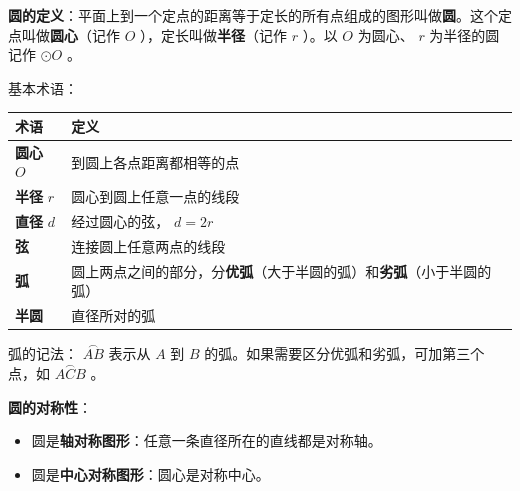 \begin{understand}


\textbf{圆的定义}：平面上到一个定点的距离等于定长的所有点组成的图形叫做\textbf{圆}。这个定点叫做\textbf{圆心}（记作 $O$ ），定长叫做\textbf{半径}（记作 $r$ ）。以 $O$ 为圆心、 $r$ 为半径的圆记作 $\odot O$ 。

\begin{center}
\label{fig:circle-elements}
\end{center}


基本术语：
\begin{center}
\begin{tabular}{ll}
\toprule
术语 & 定义 \\
\midrule
\textbf{圆心} $O$ & 到圆上各点距离都相等的点 \\
\textbf{半径} $r$ & 圆心到圆上任意一点的线段 \\
\textbf{直径} $d$ & 经过圆心的弦， $d = 2r$ \\
\textbf{弦} & 连接圆上任意两点的线段 \\
\textbf{弧} & 圆上两点之间的部分，分\textbf{优弧}（大于半圆的弧）和\textbf{劣弧}（小于半圆的弧） \\
\textbf{半圆} & 直径所对的弧 \\
\bottomrule
\end{tabular}
\end{center}


弧的记法： $\overset{\frown}{AB}$ 表示从 $A$ 到 $B$ 的弧。如果需要区分优弧和劣弧，可加第三个点，如 $\overset{\frown}{ACB}$ 。

\textbf{圆的对称性}：
\begin{itemize}
  \item 圆是\textbf{轴对称图形}：任意一条直径所在的直线都是对称轴。
  \item 圆是\textbf{中心对称图形}：圆心是对称中心。
\end{itemize}


\end{understand}

